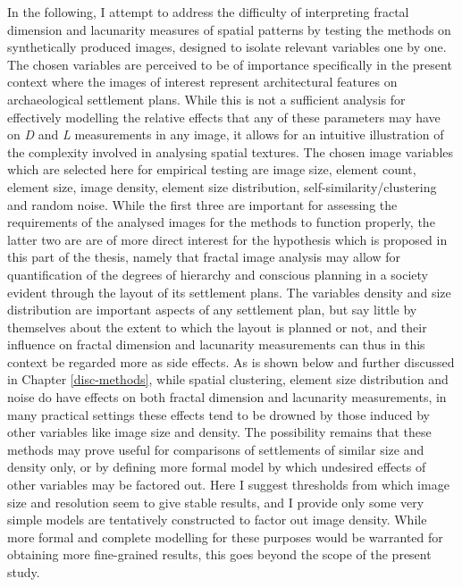 \documentclass[
  12pt,
]{book}
\begin{document}
In the following, I attempt to address the difficulty of interpreting fractal dimension and lacunarity measures of spatial patterns by testing the methods on synthetically produced images, designed to isolate relevant variables one by one. The chosen variables are perceived to be of importance specifically in the present context where the images of interest represent architectural features on archaeological settlement plans. While this is not a sufficient analysis for effectively modelling the relative effects that any of these parameters may have on \emph{D} and \emph{L} measurements in any image, it allows for an intuitive illustration of the complexity involved in analysing spatial textures. The chosen image variables which are selected here for empirical testing are image size, element count, element size, image density, element size distribution, self-similarity/clustering and random noise. While the first three are important for assessing the requirements of the analysed images for the methods to function properly, the latter two are are of more direct interest for the hypothesis which is proposed in this part of the thesis, namely that fractal image analysis may allow for quantification of the degrees of hierarchy and conscious planning in a society evident through the layout of its settlement plans. The variables density and size distribution are important aspects of any settlement plan, but say little by themselves about the extent to which the layout is planned or not, and their influence on fractal dimension and lacunarity measurements can thus in this context be regarded more as side effects. As is shown below and further discussed in Chapter \ref{disc-methods}, while spatial clustering, element size distribution and noise do have effects on both fractal dimension and lacunarity measurements, in many practical settings these effects tend to be drowned by those induced by other variables like image size and density. The possibility remains that these methods may prove useful for comparisons of settlements of similar size and density only, or by defining more formal model by which undesired effects of other variables may be factored out. Here I suggest thresholds from which image size and resolution seem to give stable results, and I provide only some very simple models are tentatively constructed to factor out image density. While more formal and complete modelling for these purposes would be warranted for obtaining more fine-grained results, this goes beyond the scope of the present study.
\end{document}
